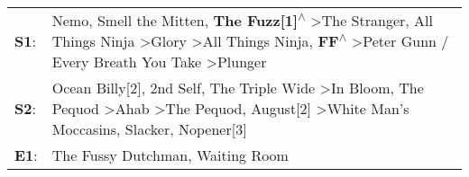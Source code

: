 \begin{supertabular}{p{0.03\textwidth}p{0.92\textwidth}}
 \textbf{S1}:  &  Nemo\textsuperscript{}, \enspace Smell the Mitten\textsuperscript{}, \enspace \textbf{The Fuzz[1]\textsuperscript{$\wedge$}} \textgreater \enspace The Stranger\textsuperscript{}, \enspace All Things Ninja\textsuperscript{} \textgreater \enspace Glory\textsuperscript{} \textgreater \enspace All Things Ninja\textsuperscript{}, \enspace \textbf{FF\textsuperscript{$\wedge$}} \textgreater \enspace Peter Gunn / Every Breath You Take\textsuperscript{} \textgreater \enspace Plunger\textsuperscript{}  \enspace  \\
 \textbf{S2}:  &                          Ocean Billy[2]\textsuperscript{}, \enspace 2nd Self\textsuperscript{}, \enspace The Triple Wide\textsuperscript{} \textgreater \enspace In Bloom\textsuperscript{}, \enspace The Pequod\textsuperscript{} \textgreater \enspace Ahab\textsuperscript{} \textgreater \enspace The Pequod\textsuperscript{}, \enspace August[2]\textsuperscript{} \textgreater \enspace White Man's Moccasins\textsuperscript{}, \enspace Slacker\textsuperscript{}, \enspace Nopener[3]\textsuperscript{}  \enspace  \\
 \textbf{E1}:  &                                                                                                                                                                                                                                                                                                                                                                                                                                     The Fussy Dutchman\textsuperscript{}, \enspace Waiting Room\textsuperscript{}  \enspace  \\
\end{supertabular}
